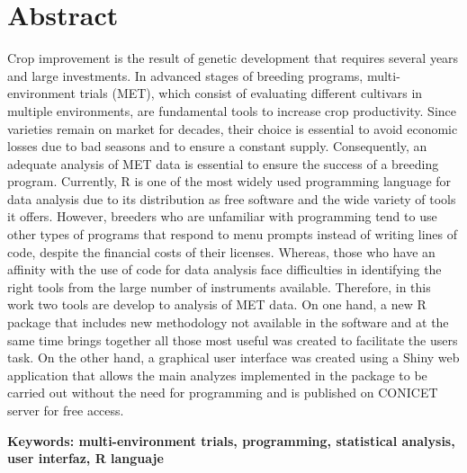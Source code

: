 
\chapter*{Abstract}


Crop improvement is the result of genetic development that requires several years and large investments. In advanced stages of breeding programs, multi-environment trials (MET), which consist of evaluating different cultivars in multiple environments, are fundamental tools to increase crop productivity. Since varieties remain on market for decades, their choice is essential to avoid economic losses due to bad seasons and to ensure a constant supply. Consequently, an adequate analysis of MET data is essential to ensure the success of a breeding program. Currently, R is one of the most widely used programming language for data analysis due to its distribution as free software and the wide variety of tools it offers. However, breeders who are unfamiliar with programming tend to use other types of programs that respond to menu prompts instead of writing lines of code, despite the financial costs of their licenses. Whereas, those who have an affinity with the use of code for data analysis face difficulties in identifying the right tools from the large number of instruments available. Therefore, in this work two tools are develop to analysis of MET data. On one hand, a new R package that includes new methodology not available in the software and at the same time brings together all those most useful  was created to facilitate the users task. On the other hand, a graphical user interface was created using a Shiny web application that allows the main analyzes implemented in the package to be carried out without the need for programming and is published on CONICET server for free access. 

\textbf{Keywords: multi-environment trials, programming, statistical analysis, user interfaz, R languaje}

